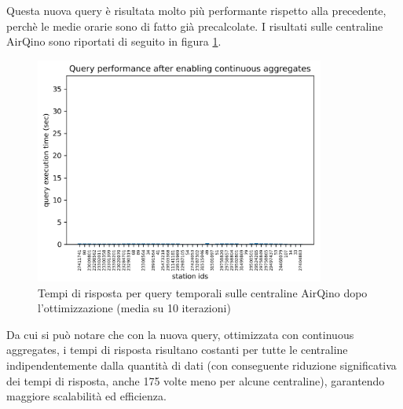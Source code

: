Questa nuova query è risultata molto più performante rispetto alla precedente, perchè le medie orarie sono di fatto già precalcolate. I risultati sulle centraline AirQino sono riportati di seguito in figura \ref{fig:query-dopo}.

\begin{figure}[H]
\centering
\captionsetup{justification=centering}
\includegraphics[width=0.85\textwidth,height=\textheight,keepaspectratio]{img/query_dopo}
\caption{Tempi di risposta per query temporali sulle centraline AirQino dopo l'ottimizzazione (media su 10 iterazioni)}
\label{fig:query-dopo}
\end{figure}

Da cui si può notare che con la nuova query, ottimizzata con continuous aggregates, i tempi di risposta risultano costanti per tutte le centraline indipendentemente dalla quantità di dati (con conseguente riduzione significativa dei tempi di risposta, anche 175 volte meno per alcune centraline), garantendo maggiore scalabilità ed efficienza.

